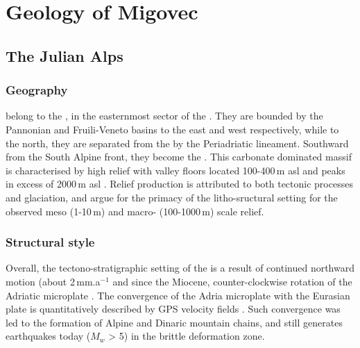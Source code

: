 \chapter{Geology of Migovec}

\section{The Julian Alps}
\label{sec:The Julian Alps}

\subsection{Geography} 
\label{par:Geography} 
 belong to the , in the easternmost sector of the  \citep{bavec2004late}. 
They  are bounded by the Pannonian and  Fruili-Veneto basins to the east and west respectively, while to the north, they are separated from the  by the Periadriatic lineament. Southward from the South Alpine front, they become the  \citep{placer1998contribution,burrato2008sources}.
This carbonate dominated massif is characterised by high relief with valley floors located 100-400\,m asl and peaks in excess of 2000\,m asl  \citep{vsmuc2009tectonic}. Relief production is attributed to both tectonic processes and glaciation, and \citet{vsmuc2009tectonic} argue for the primacy of the litho-sructural setting for the observed meso (1-10\,m) and macro- (100-1000\,m) scale relief.


\subsection{Structural style}
\label{par:Structural style}
Overall, the tectono-stratigraphic setting  of the  is a result of continued northward motion (about 2\,mm.a$^{-1}$ \citep{burrato2008sources} and since the Miocene,  counter-clockwise rotation of the Adriatic microplate \citep{marton2003palaeomagnetic}. 
The convergence of the Adria microplate with the Eurasian plate is quantitatively described by GPS velocity fields \citep{grenerczy2005tectonic}. 
Such convergence was led to the formation of Alpine and Dinaric mountain chains, and still generates earthquakes today ($M_w$ > 5) in the brittle deformation zone.

